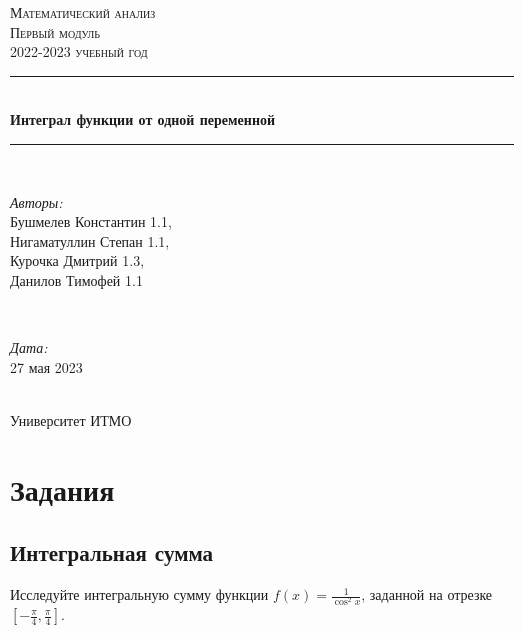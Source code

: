 \documentclass{article}
\begin{document}
\begin{titlepage}
    \centering
    \vspace*{0.5 cm}
    \textsc{\LARGE Математический анализ}\\[1.0 cm]
    \textsc{\Large Первый модуль}\\[0.5 cm]
    \textsc{\large 2022-2023 учебный год}\\[1.5 cm]
    \rule{\linewidth}{0.1 mm} \\[0.4 cm]
    { \huge \bfseries Интеграл функции от одной переменной}\\[0.2 cm]
    \rule{\linewidth}{0.1 mm} \\[2 cm]
    \begin{minipage}{0.6\textwidth}
        \begin{flushleft} \large
            \emph{Авторы:}\\
            Бушмелев Константин 1.1,\\ 
            Нигаматуллин Степан 1.1,\\
            Курочка Дмитрий 1.3,\\
            Данилов Тимофей 1.1
        \end{flushleft}
    \end{minipage}~
    \begin{minipage}{0.4\textwidth}
        \begin{flushright} \large
            \emph{Дата:} \\
            27 мая 2023
        \end{flushright}
    \end{minipage}\\[2 cm]
    {\large Университет ИТМО}\\[2 cm]
    \vfill
\end{titlepage}

\renewcommand{\contentsname}{Содержимое}
\tableofcontents
\newpage


\section{Задания}

\subsection{Интегральная сумма}

Исследуйте интегральную сумму функции $f(x) = \frac{1}{\cos^2{x}}$, заданной на отрезке $[-\frac{\pi}{4}, \frac{\pi}{4}]$.
\end{document}

